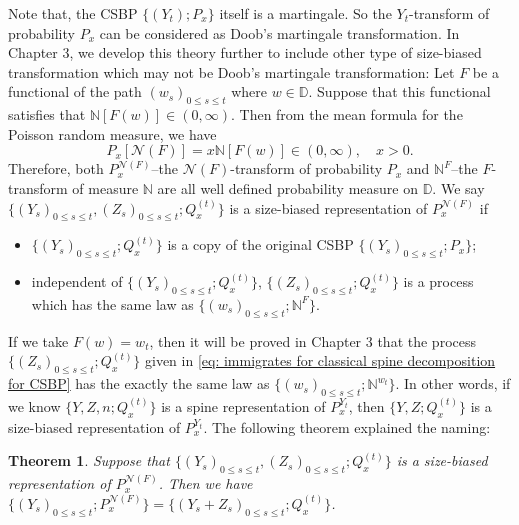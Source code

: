 \documentclass[UTF8]{pkuthss}
\theoremstyle{plain}
\newtheorem{thm}{Theorem}[section]
\theoremstyle{definition}
\numberwithin{equation}{section}
\begin{document}
	Note that, the CSBP $\{(Y_t); P_x\}$ itself is a martingale. So the $Y_t$-transform of probability $P_x$ can be considered as Doob's martingale transformation.
	In Chapter 3, we develop this theory further to include other type of size-biased transformation which may not be Doob's martingale transformation: Let $F$ be a functional of the path $(w_s)_{0\leq s\leq t}$ where $w \in \mathbb D$. Suppose that this functional satisfies that $\mathbb N[F(w)] \in (0,\infty)$. Then from the mean formula for the Poisson random measure, we have
\[
	P_x[\mathcal N(F)]= x\mathbb N[F(w)]\in (0,\infty),\quad x>0.	
\]
	Therefore, both $P_x^{\mathcal N(F)}$--the $\mathcal N(F)$-transform of probability $P_x$ and $\mathbb N^{F}$--the $F$-transform of measure $\mathbb N$ are all well defined probability measure on $\mathbb D$.
	We say $\{(Y_s)_{0\leq s\leq t}, (Z_s)_{0\leq s\leq t}; Q_x^{(t)}\}$ is a size-biased representation of $P_x^{\mathcal N(F)}$ if
\begin{itemize}
\item
	$\{(Y_s)_{0\leq s\leq t}; Q_x^{(t)}\}$ is a copy of the original CSBP $\{(Y_s)_{0\leq s\leq t}; P_x\}$;
\item
	independent of $\{(Y_s)_{0\leq s\leq t}; Q_x^{(t)}\}$, $\{(Z_s)_{0\leq s\leq t}; Q_x^{(t)}\}$ is a process which has the same law as $\{(w_s)_{0\leq s\leq t}; \mathbb N^F\}$.
\end{itemize}
	If we take $F(w)= w_t$, then it will be proved in Chapter 3 that the process $\{(Z_s)_{0\leq s\leq t}; Q_x^{(t)}\}$ given in \eqref{eq: immigrates for classical spine decomposition for CSBP} has the exactly the same law as $\{(w_s)_{0\leq s\leq t}; \mathbb N^{w_t}\}$. 
	In other words, if we know $\{Y, Z, n; Q_x^{(t)}\}$ is a spine representation of $P_x^{Y_t}$, then $\{Y, Z; Q_x^{(t)}\}$ is a size-biased representation of $P_x^{Y_t}$. The following theorem explained the naming: 

\begin{thm}
	Suppose that $\{(Y_s)_{0\leq s\leq t}, (Z_s)_{0\leq s\leq t}; Q_x^{(t)}\}$ is a size-biased representation of $P_x^{\mathcal N(F)}$. Then we have $\{(Y_s)_{0\leq s\leq t}; P^{\mathcal N(F)}_x\} = \{(Y_s+Z_s)_{0\leq s\leq t}; Q_x^{(t)}\}$.
\end{thm}
	
\end{document}
